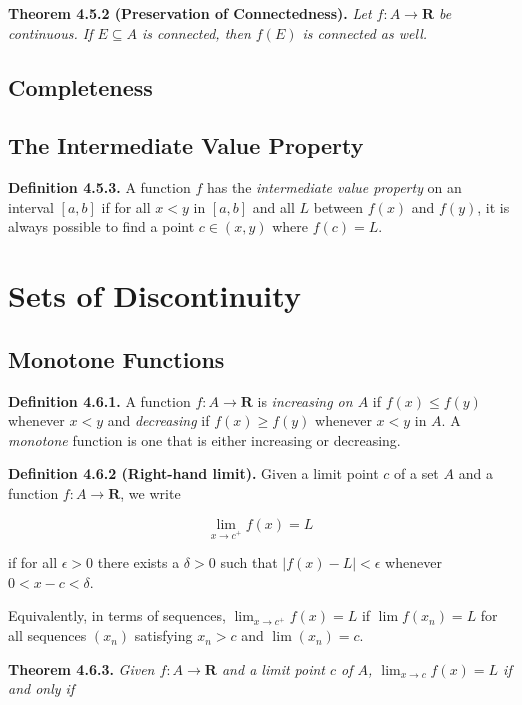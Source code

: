 \documentclass[12pt]{report}
\newcommand{\R}{\textbf{R}}
\begin{document}
\noindent \textbf{Theorem 4.5.2 (Preservation of Connectedness).} \textit{Let $f:A\rightarrow\R$ be continuous.  If $E\subseteq A$ is connected, then $f(E)$ is connected as well.}
\bigskip

\subsection*{Completeness}

\bigskip

\subsection*{The Intermediate Value Property}

\noindent \textbf{Definition 4.5.3.} A function $f$ has the \textit{intermediate value property} on an interval $[a,b]$ if for all $x<y$ in $[a,b]$ and all $L$ between $f(x)$ and $f(y)$, it is always possible to find a point $c\in(x,y)$ where $f(c)=L$.
\bigskip

\section{Sets of Discontinuity}

\subsection*{Monotone Functions}

\noindent \textbf{Definition 4.6.1.} A function $f:A\rightarrow\R$ is \textit{increasing on $A$} if $f(x)\leq f(y)$ whenever $x<y$ and \textit{decreasing} if $f(x)\geq f(y)$ whenever $x<y$ in $A$.  A \textit{monotone} function is one that is either increasing or decreasing.
\bigskip

\noindent \textbf{Definition 4.6.2 (Right-hand limit).} Given a limit point $c$ of a set $A$ and a function $f:A\rightarrow\R$, we write

\[\lim_{x\rightarrow c^+}f(x)=L\]

\noindent if for all $\epsilon>0$ there exists a $\delta>0$ such that $|f(x)-L|<\epsilon$ whenever $0<x-c<\delta$.

Equivalently, in terms of sequences, $\lim_{x\rightarrow c^+}f(x)=L$ if $\lim f(x_n)=L$ for all sequences $(x_n)$ satisfying $x_n>c$ and $\lim(x_n)=c$.
\bigskip

\noindent \textbf{Theorem 4.6.3.} \textit{Given $f:A\rightarrow\R$ and a limit point $c$ of $A$, $\lim_{x\rightarrow c}f(x)=L$ if and only if}
\end{document}
